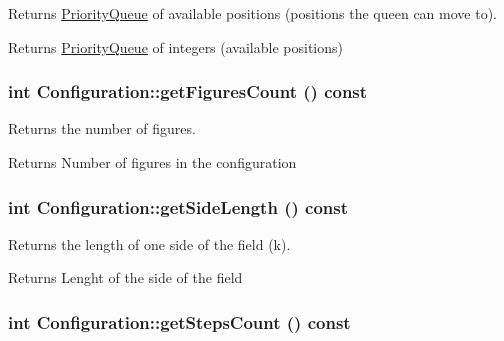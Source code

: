 Returns \hyperlink{class_priority_queue}{PriorityQueue} of available positions (positions the queen can move to). 

\begin{DoxyReturn}{Returns}
\hyperlink{class_priority_queue}{PriorityQueue} of integers (available positions) 
\end{DoxyReturn}
\hypertarget{class_configuration_a309ee0fb70a3fbbdeb82a2e5f856e9f5}{
\subsubsection[{getFiguresCount}]{\setlength{\rightskip}{0pt plus 5cm}int Configuration::getFiguresCount () const}}
\label{class_configuration_a309ee0fb70a3fbbdeb82a2e5f856e9f5}


Returns the number of figures. 

\begin{DoxyReturn}{Returns}
Number of figures in the configuration 
\end{DoxyReturn}
\hypertarget{class_configuration_a6c683c5112b783922f924446cb5a8e5b}{
\subsubsection[{getSideLength}]{\setlength{\rightskip}{0pt plus 5cm}int Configuration::getSideLength () const}}
\label{class_configuration_a6c683c5112b783922f924446cb5a8e5b}


Returns the length of one side of the field (k). 

\begin{DoxyReturn}{Returns}
Lenght of the side of the field 
\end{DoxyReturn}
\hypertarget{class_configuration_a899f2320c29a361457f95262eff51571}{
\subsubsection[{getStepsCount}]{\setlength{\rightskip}{0pt plus 5cm}int Configuration::getStepsCount () const}}
\label{class_configuration_a899f2320c29a361457f95262eff51571}



